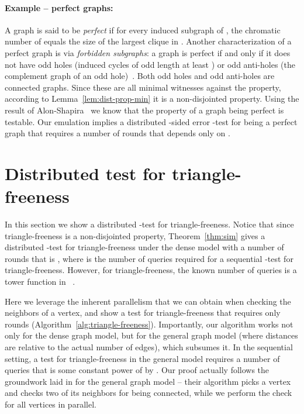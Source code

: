 \documentclass[11pt]{article}
\begin{document}
	
\paragraph{Example -- perfect graphs:} A graph  is said to be \emph{perfect} if for every induced subgraph  of , the chromatic number of  equals the size of the largest clique in .
Another characterization of a perfect graph is via \emph{forbidden subgraphs}: a graph is perfect if and only if it does not have odd holes (induced cycles of odd length at least ) or odd anti-holes (the complement graph of an odd hole)~\cite{strong}. Both odd holes and odd anti-holes are connected graphs. Since these are all minimal witnesses against the property, according to Lemma~\ref{lem:dist-prop-min} it is a non-disjointed property.
Using the result of Alon-Shapira~\cite{AlonShapira} we know that the property of a graph being perfect is testable. Our emulation implies a distributed -sided error -test for being a perfect graph that requires a number of rounds that depends only on .

\section{Distributed test for triangle-freeness}
\label{sec:triangle-freeness}
In this section we show a distributed -test for triangle-freeness. Notice that since triangle-freeness is a non-disjointed property, Theorem~\ref{thm:sim} gives a distributed -test for triangle-freeness under the dense model with a number of rounds that is , where  is the number of queries required for a sequential -test for triangle-freeness. However, for triangle-freeness, the known number of queries is a tower function in ~\cite{Fox2010}.

Here we leverage the inherent parallelism that we can obtain when checking the neighbors of a vertex, and show a test for triangle-freeness that requires only  rounds (Algorithm~\ref{alg:triangle-freeness}). Importantly, our algorithm works not only for the dense graph model, but for the general graph model (where distances are relative to the actual number of edges), which subsumes it. In the sequential setting, a test for triangle-freeness in the general model requires a number of queries that is some constant power of  by \cite{AKKR}. Our proof actually follows the groundwork laid in \cite{AKKR} for the general graph model -- their algorithm picks a vertex and checks two of its neighbors for being connected, while we perform the check for all vertices in parallel.
\end{document}
